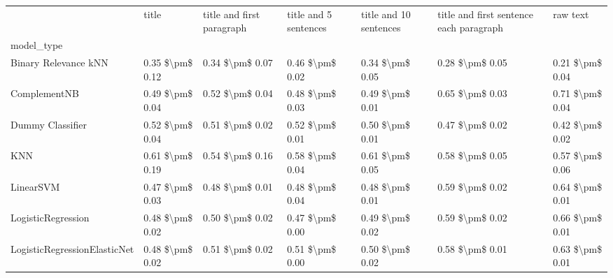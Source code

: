 \begin{tabular}{lllllll}
\toprule
{} &            title & title and first paragraph & title and 5 sentences & title and 10 sentences & title and first sentence each paragraph &             raw text \\
model\_type                      &                  &                           &                       &                        &                                         &                      \\
\midrule
Binary Relevance kNN            &  0.35 \$\textbackslash pm\$ 0.12 &           0.34 \$\textbackslash pm\$ 0.07 &       0.46 \$\textbackslash pm\$ 0.02 &        0.34 \$\textbackslash pm\$ 0.05 &                         0.28 \$\textbackslash pm\$ 0.05 &      0.21 \$\textbackslash pm\$ 0.04 \\
ComplementNB                    &  0.49 \$\textbackslash pm\$ 0.04 &           0.52 \$\textbackslash pm\$ 0.04 &       0.48 \$\textbackslash pm\$ 0.03 &        0.49 \$\textbackslash pm\$ 0.01 &                         0.65 \$\textbackslash pm\$ 0.03 &      0.71 \$\textbackslash pm\$ 0.04 \\
Dummy Classifier                &  0.52 \$\textbackslash pm\$ 0.04 &           0.51 \$\textbackslash pm\$ 0.02 &       0.52 \$\textbackslash pm\$ 0.01 &        0.50 \$\textbackslash pm\$ 0.01 &                         0.47 \$\textbackslash pm\$ 0.02 &      0.42 \$\textbackslash pm\$ 0.02 \\
KNN                             &  0.61 \$\textbackslash pm\$ 0.19 &           0.54 \$\textbackslash pm\$ 0.16 &       0.58 \$\textbackslash pm\$ 0.04 &        0.61 \$\textbackslash pm\$ 0.05 &                         0.58 \$\textbackslash pm\$ 0.05 &      0.57 \$\textbackslash pm\$ 0.06 \\
LinearSVM                       &  0.47 \$\textbackslash pm\$ 0.03 &           0.48 \$\textbackslash pm\$ 0.01 &       0.48 \$\textbackslash pm\$ 0.04 &        0.48 \$\textbackslash pm\$ 0.01 &                         0.59 \$\textbackslash pm\$ 0.02 &      0.64 \$\textbackslash pm\$ 0.01 \\
LogisticRegression              &  0.48 \$\textbackslash pm\$ 0.02 &           0.50 \$\textbackslash pm\$ 0.02 &       0.47 \$\textbackslash pm\$ 0.00 &        0.49 \$\textbackslash pm\$ 0.02 &                         0.59 \$\textbackslash pm\$ 0.02 &      0.66 \$\textbackslash pm\$ 0.01 \\
LogisticRegressionElasticNet    &  0.48 \$\textbackslash pm\$ 0.02 &           0.51 \$\textbackslash pm\$ 0.02 &       0.51 \$\textbackslash pm\$ 0.00 &        0.50 \$\textbackslash pm\$ 0.02 &                         0.58 \$\textbackslash pm\$ 0.01 &      0.63 \$\textbackslash pm\$ 0.01 \\

\end{tabular}
